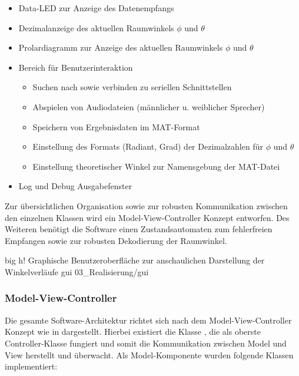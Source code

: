 \begin{itemize}
    \item Data-LED zur Anzeige des Datenempfangs
    \item Dezimalanzeige des aktuellen Raumwinkels $\phi$ und $\theta$
    \item Prolardiagramm zur Anzeige des aktuellen Raumwinkels $\phi$ und $\theta$
    \item Bereich für Benutzerinteraktion
        \begin{itemize}
            \item Suchen nach sowie verbinden zu seriellen Schnittstellen
            \item Abspielen von Audiodateien (männlicher u. weiblicher Sprecher)
            \item Speichern von Ergebnisdaten im MAT-Format
            \item Einstellung des Formats (Radiant, Grad) der Dezimalzahlen für $\phi$ und $\theta$
            \item Einstellung theoretischer Winkel zur Namensgebung der MAT-Datei
        \end{itemize}
    \item Log und Debug Ausgabefenster
\end{itemize}


Zur übersichtlichen Organisation sowie zur robusten Kommunikation zwischen den einzelnen Klassen wird ein Model-View-Controller Konzept entworfen. Des Weiteren benötigt die Software einen Zustandsautomaten zum fehlerfreien Empfangen sowie zur robusten Dekodierung der Raumwinkel.



         {big}                                              %
         {h!}                                                  %
         {Graphische Benutzeroberfläche zur anschaulichen Darstellung der Winkelverläufe}       %
         {gui}                                 %
         {03_Realisierung/gui}


\subsubsection{Model-View-Controller}
Die gesamte Software-Architektur richtet sich nach dem Model-View-Controller Konzept wie in  dargestellt. Hierbei existiert die Klasse , die als oberste Controller-Klasse fungiert und somit die Kommunikation zwischen Model und View herstellt und überwacht. Als Model-Komponente wurden folgende Klassen implementiert:


